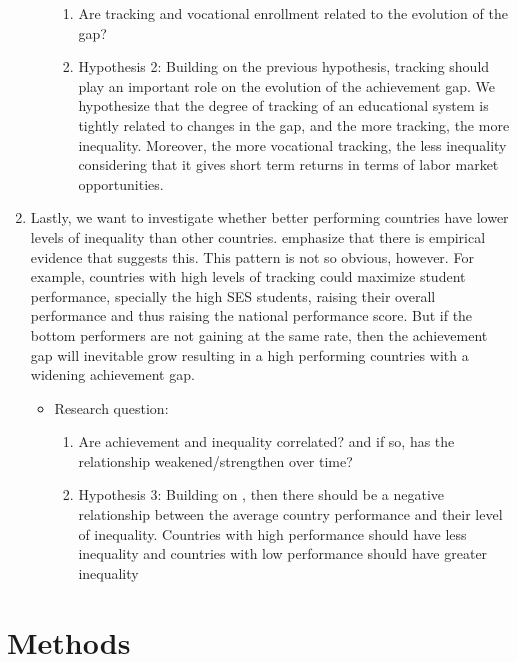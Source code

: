 \documentclass[11pt, a4paper]{article}\usepackage[]{graphicx}\usepackage[]{color}
\begin{document}
\begin{enumerate}
\begin{itemize}
\begin{enumerate}
\item Are tracking and vocational enrollment related to the evolution of the gap?

\item Hypothesis 2: Building on the previous hypothesis, tracking should play an important role on the evolution of the achievement gap. We hypothesize that the degree of tracking of an educational system is tightly related to changes in the gap, and the more tracking, the more inequality. Moreover, the more vocational tracking, the less inequality considering that it gives short term returns in terms of labor market opportunities.

\end{enumerate}
\end{itemize}

\item Lastly, we want to investigate whether better performing countries have lower levels of inequality than other countries. \citet{werfhorst_mijs} emphasize that there is empirical evidence that suggests this. This pattern is not so obvious, however. For example, countries with high levels of tracking could maximize student performance, specially the high SES students, raising their overall performance and thus raising the national performance score. But if the bottom performers are not gaining at the same rate, then the achievement gap will inevitable grow resulting in a high performing countries with a widening achievement gap.

\begin{itemize}
\item Research question:
\begin{enumerate}

\item Are achievement and inequality correlated? and if so, has the relationship weakened/strengthen over time?

\item Hypothesis 3: Building on \citet{werfhorst_mijs}, then there should be a negative relationship between the average country performance and their level of inequality. Countries with high performance should have less inequality and countries with low performance should have greater inequality

\end{enumerate}
\end{itemize}

\end{enumerate}

\section{Methods}
\end{document}
